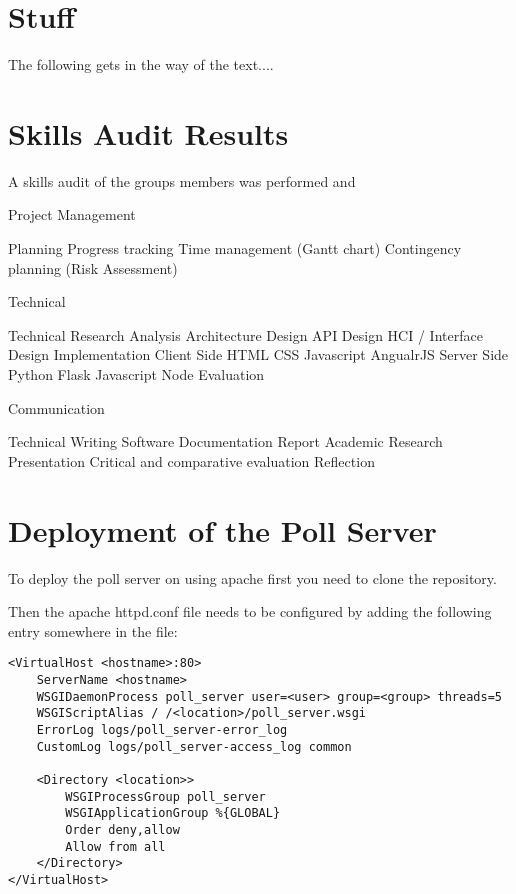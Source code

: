 \chapter{Stuff} \label{Chapter:Stuff}
The following gets in the way of the text....

\chapter{Skills Audit Results} \label{Chapter:Skills Audit Results}

A skills audit of the groups members was performed and 

Project Management

Planning 
Progress tracking 
Time management (Gantt chart) 
Contingency planning (Risk Assessment) 

Technical

Technical Research
Analysis
Architecture Design
API Design
HCI / Interface Design
Implementation
	Client Side
		HTML
		CSS
		Javascript
			AngualrJS
	Server Side
		Python
			Flask
		Javascript
			Node
Evaluation

Communication

Technical Writing
	Software Documentation
	Report
Academic Research
Presentation
Critical and comparative evaluation 
Reflection 

\chapter{Deployment of the Poll Server} \label{Chapter:Deployment Poll Server}

To deploy the poll server on using apache first you need to clone the repository.

Then the apache httpd.conf file needs to be configured by adding the following entry somewhere in the file:

\begin{lstlisting}[caption={\label{code:apacheConfig} Apache configuration}]
<VirtualHost <hostname>:80>
	ServerName <hostname>
	WSGIDaemonProcess poll_server user=<user> group=<group> threads=5
	WSGIScriptAlias / /<location>/poll_server.wsgi
	ErrorLog logs/poll_server-error_log
	CustomLog logs/poll_server-access_log common

	<Directory <location>>
		WSGIProcessGroup poll_server
		WSGIApplicationGroup %{GLOBAL}
		Order deny,allow
		Allow from all
	</Directory>
</VirtualHost>
\end{lstlisting}

